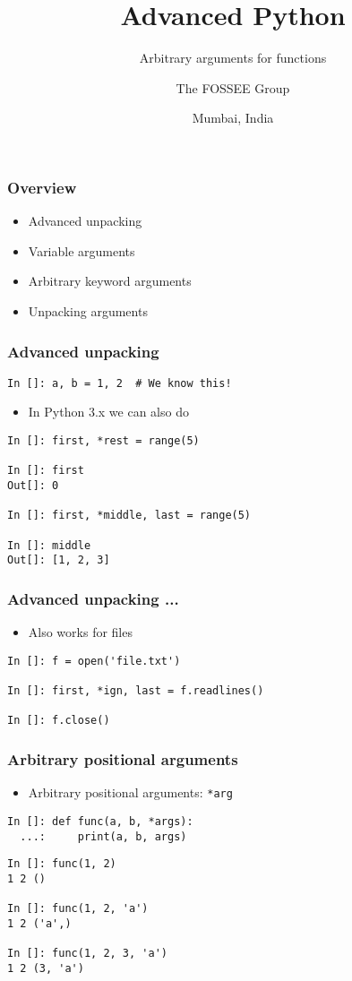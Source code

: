 \documentclass[14pt,compress]{beamer}
\title[*args, **kw]{Advanced Python}
\subtitle{Arbitrary arguments for functions}
\author[FOSSEE] {The FOSSEE Group}
\institute[IIT Bombay] {Department of Aerospace Engineering\\IIT Bombay}
\date[] {Mumbai, India}
\begin{document}
\begin{frame}
  \titlepage
\end{frame}

\begin{frame}
  \frametitle{Overview}
  \begin{itemize}
  \item Advanced unpacking
  \item Variable arguments
  \item Arbitrary keyword arguments
  \item Unpacking arguments
  \end{itemize}
\end{frame}

\begin{frame}[fragile]
  \frametitle{Advanced unpacking}
\begin{lstlisting}
In []: a, b = 1, 2  # We know this!
\end{lstlisting}
  \pause
  \begin{itemize}
  \item In Python 3.x we can also do
  \end{itemize}
\begin{lstlisting}
In []: first, *rest = range(5)

In []: first
Out[]: 0

In []: first, *middle, last = range(5)

In []: middle
Out[]: [1, 2, 3]
\end{lstlisting}
\end{frame}

\begin{frame}[fragile]
  \frametitle{Advanced unpacking ...}
  \begin{itemize}
    \item Also works for files
  \end{itemize}
\begin{lstlisting}
In []: f = open('file.txt')

In []: first, *ign, last = f.readlines()

In []: f.close()
\end{lstlisting}
\end{frame}

\begin{frame}[fragile]
  \frametitle{Arbitrary positional arguments}
  \begin{itemize}
  \item Arbitrary positional arguments: \lstinline{*arg}
  \end{itemize}

\begin{lstlisting}
In []: def func(a, b, *args):
  ...:     print(a, b, args)
\end{lstlisting}
\pause
\begin{lstlisting}
In []: func(1, 2)
1 2 ()

In []: func(1, 2, 'a')
1 2 ('a',)

In []: func(1, 2, 3, 'a')
1 2 (3, 'a')
\end{lstlisting}

\end{frame}
\end{document}

